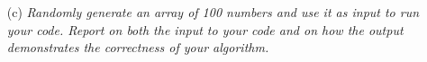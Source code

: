 \documentclass[12pt]{article}
\begin{document}
{\begin{enumerate}
\begin{lstlisting}[language=Python]
  return count
\end{lstlisting}
\item[(c)]\textsl{Randomly generate an array of 100 numbers and use it as input to run your code. Report on both the input to your code and on how the output demonstrates the correctness of your algorithm.}\\ \\
    
\end{enumerate}

}
\end{document}

